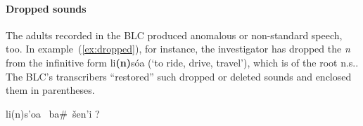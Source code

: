 

\paragraph{Dropped sounds}
The adults recorded in the BLC produced anomalous or non-standard speech, too. In example~(\ref{ex:dropped}), for instance, the investigator 
has dropped the 
\emph{n} from the infinitive form 
\textsf{li\textbf{(n)}s\'oa} (`to ride, drive, travel'), 
which is of the root n.s.. 
The \ac{BLC}'s transcribers ``restored'' such dropped or deleted sounds and enclosed them in parentheses.
\begin{exe} 
\ex \label{ex:dropped} \textsf{li(n)s\a'{o}a \, ba\#\, \v{s}en\a'{i} ?}
\end{exe}


